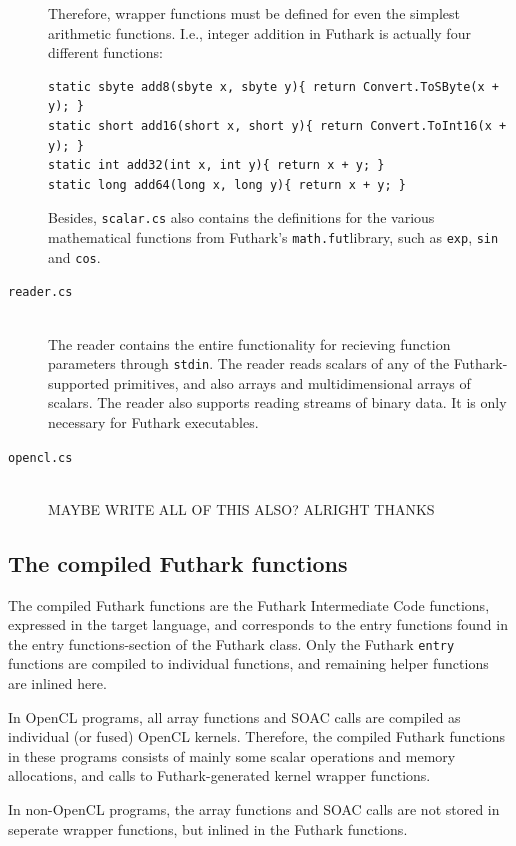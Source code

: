 \begin{description}
  Therefore, wrapper functions must be defined for even the simplest arithmetic
  functions. I.e., integer addition in \csharp{} Futhark is actually four different
  functions:
\begin{verbatim}
static sbyte add8(sbyte x, sbyte y){ return Convert.ToSByte(x + y); }
static short add16(short x, short y){ return Convert.ToInt16(x + y); }
static int add32(int x, int y){ return x + y; }
static long add64(long x, long y){ return x + y; }
\end{verbatim}

  Besides, \texttt{scalar.cs} also contains the \csharp{} definitions for the various
  mathematical functions from Futhark's \texttt{math.fut}library, such as \texttt{exp},
  \texttt{sin} and \texttt{cos}.

\item[\texttt{reader.cs}] \hfill\\
  The reader contains the entire functionality for recieving function parameters
  through \texttt{stdin}. The reader reads scalars of any of the
  Futhark-supported primitives, and also arrays and multidimensional arrays of
  scalars.
  The reader also supports reading streams of binary data.
  It is only necessary for Futhark executables.
\item[\texttt{opencl.cs}] \hfill\\
  MAYBE WRITE ALL OF THIS ALSO? ALRIGHT THANKS
\end{description}

\subsection*{The compiled Futhark functions}
  The compiled Futhark functions are the Futhark Intermediate Code functions,
  expressed in the target language, and corresponds to the entry functions found
  in the entry functions-section of the Futhark class.
  Only the Futhark \texttt{entry} functions are compiled to individual functions, and
  remaining helper functions are inlined here.

  In OpenCL programs, all array functions and SOAC calls are compiled as
  individual (or fused) OpenCL kernels. Therefore, the compiled Futhark
  functions in these programs consists of mainly some scalar operations and
  memory allocations, and calls to Futhark-generated kernel wrapper functions.
  
  In non-OpenCL programs, the array functions and SOAC calls are not stored in
  seperate wrapper functions, but inlined in the Futhark functions.


